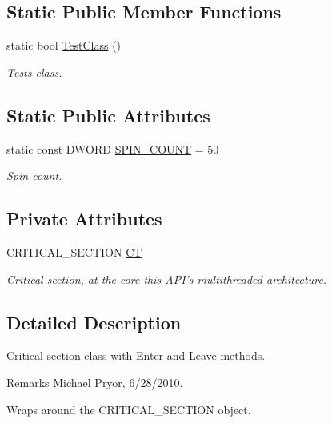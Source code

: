 \subsection*{Static Public Member Functions}
\begin{DoxyCompactItemize}
\item 
static bool \hyperlink{class_critical_section_a3af679f4de9f3e923dfc079f3604b354}{TestClass} ()
\begin{DoxyCompactList}\small\item\em Tests class. \item\end{DoxyCompactList}\end{DoxyCompactItemize}
\subsection*{Static Public Attributes}
\begin{DoxyCompactItemize}
\item 
\hypertarget{class_critical_section_a87e07ea1f0ba0f46ffc905516777fe64}{
static const DWORD \hyperlink{class_critical_section_a87e07ea1f0ba0f46ffc905516777fe64}{SPIN\_\-COUNT} = 50}
\label{class_critical_section_a87e07ea1f0ba0f46ffc905516777fe64}

\begin{DoxyCompactList}\small\item\em Spin count. \item\end{DoxyCompactList}\end{DoxyCompactItemize}
\subsection*{Private Attributes}
\begin{DoxyCompactItemize}
\item 
\hypertarget{class_critical_section_aa5e93e9884cfa8d5304827338362c0f3}{
CRITICAL\_\-SECTION \hyperlink{class_critical_section_aa5e93e9884cfa8d5304827338362c0f3}{CT}}
\label{class_critical_section_aa5e93e9884cfa8d5304827338362c0f3}

\begin{DoxyCompactList}\small\item\em Critical section, at the core this API's multithreaded architecture. \item\end{DoxyCompactList}\end{DoxyCompactItemize}


\subsection{Detailed Description}
Critical section class with Enter and Leave methods. \begin{DoxyRemark}{Remarks}
Michael Pryor, 6/28/2010.
\end{DoxyRemark}
Wraps around the CRITICAL\_\-SECTION object. \par
\par



